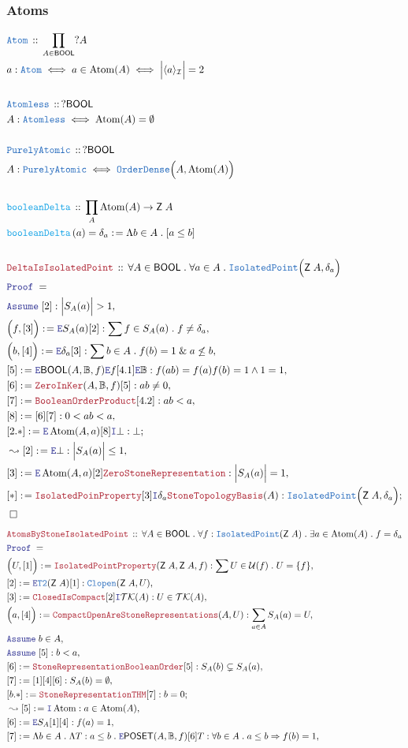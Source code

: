 \documentclass[12pt]{scrartcl}
\newcommand{\TYPE}[1]{\textcolor{NavyBlue}{\mathtt{#1}}}
\newcommand{\FUNC}[1]{\textcolor{Cerulean}{\mathtt{#1}}}
\newcommand{\LOGIC}[1]{\textcolor{Blue}{\mathtt{#1}}}
\newcommand{\THM}[1]{\textcolor{Maroon}{\mathtt{#1}}}
\renewcommand{\.}{\; . \;}
\newcommand{\de}{: \kern 0.1pc =}
\newcommand{\Act}[1]{\left( #1 \right)}
\newcommand{\Theorem}[2]{& \THM{#1} \, :: \, #2 \\ & \Proof = \\ }
\newcommand{\DeclareType}[2]{& \TYPE{#1} \, :: \, #2 \\}
\newcommand{\DefineType}[3]{& #1 : \TYPE{#2} \iff #3 \\}
\newcommand{\DefineNamedType}[4]{& #1 : \TYPE{#2} \iff #3 \iff #4 \\}
\newcommand{\DeclareFunc}[2]{& \FUNC{#1} \, :: \, #2 \\}
\newcommand{\DefineNamedFunc}[4]{&  \FUNC{#1}\Act{#2} = #3 \de #4 \\}
\newcommand{\Page}[1]{ \begin{align*} #1 \end{align*}   }
\renewcommand{\And}{\; \& \;}
\newcommand{\Imply}{\Rightarrow}
\newcommand{\Intro}{\LOGIC{I}}
\newcommand{\Elim}{\LOGIC{E}}
\newcommand{\Say}[3]{& #1 \de #2 : #3, \\}
\newcommand{\Conclude}[3]{& #1 \de #2 : #3; \\}
\newcommand{\Derive}[3]{& \leadsto #1 \de #2 : #3, \\}
\newcommand{\Assume}[2]{& \LOGIC{Assume} \; #1 : #2, \\}
\newcommand{\AssumeIn}[2]{& \LOGIC{Assume} \; #1 \in #2, \\}
\newcommand{\QED}{\; \square}
\newcommand{\EndProof}{& \QED \\}
\newcommand{\Proof}{\LOGIC{Proof} \; }
\newcommand{\I}{\mathcal{I}}
\newcommand{\POSET}{\mathsf{POSET}}
\newcommand{\IP}{\TYPE{IsolatedPoint}}
\newcommand{\Clopen}{\TYPE{Clopen}}
\newcommand{\U}{\mathcal{U}}
\newcommand{\Bool}{\mathbb{B}}
\newcommand{\TK}{\mathcal{TK}}
\newcommand{\OD}{\TYPE{OrderDense}}
\newcommand{\Aless}{\TYPE{Atomless}}
\newcommand{\PA}{\TYPE{PurelyAtomic}}
\DeclareMathOperator{\Atom}{Atom}
\newcommand{\BOOL}{\mathsf{BOOL}}
\newcommand{\Z}{\mathsf{Z}}
\begin{document}
\subsubsection{Atoms}
\Page{
	\DeclareType{Atom}{\prod_{A \in \BOOL} ?A}
	\DefineNamedType{a}{Atom}{a \in \Atom(A)}{ \Big| \langle a \rangle_\I \Big| = 2  }
	\\
	\DeclareType{\Aless}{?\BOOL}
	\DefineType{A}{\Aless}{\Atom(A) = \emptyset}
	\\
	\DeclareType{\PA}{?\BOOL}
	\DefineType{A}{\PA}{ \OD\Big(A,\Atom(A)\Big) }
	\\
	\DeclareFunc{booleanDelta}{\prod_{A} \Atom(A) \to \Z\;A}
	\DefineNamedFunc{booleanDelta}{a}{\delta_a}
	{
		\Lambda b \in A \. [a \le b] 
	}
	\\
	\Theorem{DeltaIsIsolatedPoint}
	{
		\forall A \in \BOOL \. 
		\forall a \in A \.
		\IP\Big(\Z\;A,\delta_a\Big)
	}
	\Assume{[2]}{\Big|S_A(a)\Big| > 1}
	\Say{\Big(f,[3]\Big)}{\Elim S_A(a) [2]}{
		\sum f \in S_A(a) \. f \neq \delta_a  
	}
	\Say{\Big(b,[4]\Big)}{\Elim \delta_a [3] }
	{
		\sum b \in A \. f(b) = 1 \And a \not \le b	
	}
	\Say{[5]}{\Elim \BOOL(A,\Bool,f)\Elim f [4.1] \Elim \Bool}
	{
		f(ab) = f(a)f(b) = 1 \wedge 1 = 1
	}
	\Say{[6]}{\THM{ZeroInKer}(A,\Bool,f)[5]}{ab \neq 0}
	\Say{[7]}{\THM{BooleanOrderProduct}[4.2] }{ab < a}
	\Say{[8]}{[6][7]}{0 < ab < a}
	\Conclude{[2.*]}{\Elim \Atom(A,a)[8]\Intro \bot}{\bot}
	\Derive{[2]}{\Elim \bot }{ \Big| S_A(a) \Big| \le 1 }
	\Say{[3]}{\Elim \Atom(A,a)[2]\THM{ZeroStoneRepresentation}}
	{
			\Big| S_A(a) \Big| = 1
	}
	\Conclude{[*]}{
		\THM{IsolatedPoinProperty} [3] 
		\Intro \delta_a 
		\THM{StoneTopologyBasis}(A)
	}
	{
			\IP\Big(\Z\;A,\delta_a\Big)
	}
	\EndProof
}\Page{
	\Theorem{AtomsByStoneIsolatedPoint}
	{
		\forall A \in \BOOL \.
		\forall f : \IP(\Z\;A) \.
		\exists a \in \Atom(A) \.
		f = \delta_a
	}
	\Say{\Big(U,[1]\Big)}{\THM{IsolatedPointProperty}(\Z\;A,\Z\;A,f)}
	{
		\sum U \in \U(f) \. U = \{f\}
	}
	\Say{[2]}{\Elim \TYPE{T2}(\Z\;A)[1]}{\Clopen(\Z\;A,U)}
	\Say{[3]}{\THM{ClosedIsCompact}[2]\Intro \TK(A)}{U \in \TK(A)}
	\Say{\Big(a,[4]\Big)}{\THM{CompactOpenAreStoneRepresentations}(A,U)}
	{
		\sum_{a \in A} S_A(a) = U	
	}
	\AssumeIn{b}{A}
	\Assume{[5]}{ b < a }
	\Say{[6]}{\THM{StoneRepresentationBooleanOrder}[5]}{S_A(b) \subsetneq S_A(a)}
	\Say{[7]}{[1][4][6]}{S_A(b) = \emptyset}
	\Conclude{[b.*]}{\THM{StoneRepresentationTHM}[7]}
	{
			b = 0	
	}
	\Derive{[5]}{\Intro \Atom}{a \in \Atom(A)}
	\Say{[6]}{\Elim S_A [1][4]}{f(a) = 1}
	\Say{[7]}{
		\Lambda b \in A \.
		\Lambda T : a \le b \.
		\Elim \POSET(A,\Bool,f)[6] T
	}{\forall b \in A \. a \le b \Imply f(b) = 1}
}
\end{document}
